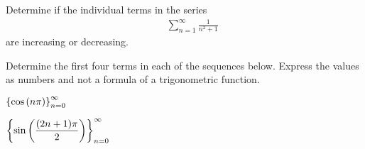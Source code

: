 \begin{problem}
\item Determine if the individual terms in the series
  \begin{eqnarray*}
    & & \sum^\infty_{n=1} \frac{1}{n^2+1}
  \end{eqnarray*}
  are increasing or decreasing.

    \vfill


  \item  Determine the first four terms in each of the sequences below. Express the values as numbers and not a formula of a trigonometric function.
    \begin{subproblem}
      \item $\displaystyle \left\{ \cos\left( n\pi \right)\right\}_{n=0}^\infty$
        \vfill
      \item $\displaystyle \left\{ \sin\left( \frac{(2n+1)\pi}{2}\right)\right\}_{n=0}^\infty$
        \vfill
    \end{subproblem}

\end{problem}


